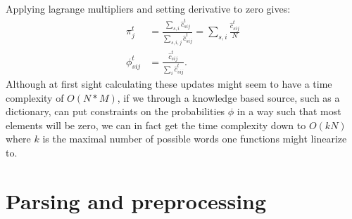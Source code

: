 Applying lagrange multipliers and setting derivative to zero gives:
\begin{equation*}
\begin{split}
\pi^t_j &= \frac{\sum_{s,i}\hat c^t_{sij}}
{\sum_{s,i,j} \hat c^t_{sij}}
= \sum_{s,i}\frac{\hat c^t_{sij}}
{N}\\
\phi_{sij}^t &= 
\frac{\hat c^t_{sij}}
{\sum_{i} \hat c^t_{sij}}.
\end{split}
\end{equation*}
Although at first sight calculating these updates might seem to have a time complexity of $O(N*M)$, if we through a knowledge based source, such as a dictionary, can put constraints on the probabilities $\phi$ in a way such that most elements will be zero, we can in fact get the time complexity down to $O(kN)$ where $k$ is the maximal number of possible words one functions might linearize to.

\section{Parsing and preprocessing}